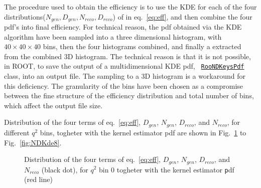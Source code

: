 The procedure used to obtain the efficiency \pdf is to use the KDE for
each of the four distributions($N_{gen}, D_{gen}, N_{reco}, D_{reco}$)
of in eq.~\ref{eq:eff}, and then combine the four pdf's into final
efficiency.  For technical reason, the pdf obtained via the KDE
algorithm have been sampled into a three dimensional histogram, with
$40\times40\times40$ bins, then the four histograms combined, and
finally a \pdf extracted from the combined 3D histogram. The technical
reason is that it is not possible, in ROOT, to save the output of a
multidimensional KDE pdf, {\tt
  \href{https://root.cern.ch/root/html/RooNDKeysPdf.html}{RooNDKeysPdf}}
class, into an output file.  The sampling to a 3D histogram is a
workaround for this deficiency. The granularity of the bins have been
chosen as a compromise between the fine structure of the efficiency
distribution and total number of bins, which affect the output file
size.

Distribution of the four terms of eq.~\ref{eq:eff}, $D_{gen}$,
$N_{gen}$, $D_{reco}$, and $N_{reco}$, for different $q^2$ bins,
togheter with the kernel estimator pdf are shown in
Fig.~\ref{fig:NDKde0} to Fig.~\ref{fig:NDKde8}.

\begin{figure}[hbt]




    \caption{Distribution of the four terms of eq.~\ref{eq:eff}, $D_{gen}$,
        $N_{gen}$, $D_{reco}$, and $N_{reco}$ (black dot), for $q^2$ bin 0
        togheter with the kernel estimator {\texttt pdf} (red line)}
    \label{fig:NDKde0}
\end{figure}

